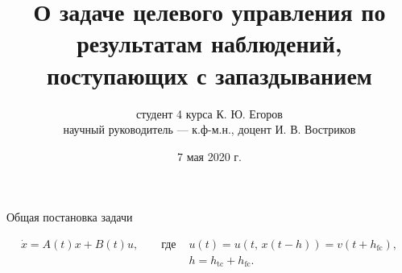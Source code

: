 
\usepackage{tikz}
\usepackage{adjustbox}

\title[Выпускная квалификационная работа]
        {О задаче целевого управления по результатам наблюдений, поступающих с запаздыванием}
\author[К. Ю. Егоров]
        {студент 4 курса К. Ю. Егоров\\
        научный руководитель --- к.ф-м.н., доцент И. В. Востриков}
\date{7 мая 2020 г.}


        \maketitle
        \begin{frame}[t]{Общая постановка задачи}
                \centering
                
                \vspace{0.5cm}
                \begin{equation*}
                        \begin{aligned}
                                \dot x = A(t)x + B(t)u, \qquad\mbox{где }
                                &u(t) = u(t,\,x(t - h)) = v(t + h_{\mathrm{fc}}),\\
                                &h = h_{\mathrm{tc}} + h_{\mathrm{fc}}.
                        \end{aligned}
                \end{equation*}
        \end{frame}
